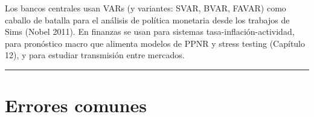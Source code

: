 \documentclass[
  spanish,
  letterpaper,
  DIV=11,
  numbers=noendperiod]{scrreprt}
\begin{document}
\begin{tcolorbox}[enhanced jigsaw, bottomrule=.15mm, colback=white, opacitybacktitle=0.6, arc=.35mm, toprule=.15mm, opacityback=0, breakable, titlerule=0mm, left=2mm, coltitle=black, colbacktitle=quarto-callout-note-color!10!white, colframe=quarto-callout-note-color-frame, leftrule=.75mm, toptitle=1mm, bottomtitle=1mm, title=\textcolor{quarto-callout-note-color}{\faInfo}\hspace{0.5em}{Los VAR en la práctica}, rightrule=.15mm]

Los bancos centrales usan VARs (y variantes: SVAR, BVAR, FAVAR) como
caballo de batalla para el análisis de política monetaria desde los
trabajos de Sims (Nobel 2011). En finanzas se usan para sistemas
tasa-inflación-actividad, para pronóstico macro que alimenta modelos de
PPNR y stress testing (Capítulo 12), y para estudiar transmisión entre
mercados.

\end{tcolorbox}

\begin{center}\rule{0.5\linewidth}{0.5pt}\end{center}

\chapter{Errores comunes}\label{errores-comunes-14}
\end{document}
